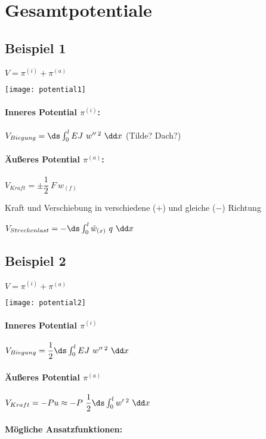 \clearpage
\section{Gesamtpotentiale}
\subsection{Beispiel 1}

	$ V = \pi^{(i)} + \pi^{(a)} $
	
	\texttt{[image: potential1]}
	
	
\paragraph{ Inneres Potential $ \pi^{(i)} $:}
	\qquad $ V_{Biegung} = \ds\int_{0}^{l} E J\ w''\,^2 \ \dd x $  (Tilde? Dach?)
	
\paragraph{ Äußeres Potential $ \pi^{(a)} $:}
	\qquad $ V_{Kraft} = \pm \dfrac{1}{2}\ F\ w_{(f)} $
	
	Kraft und Verschiebung in verschiedene ($ + $) und gleiche ($ - $) Richtung
	
	$ V_{Streckenlast} = -\ds\int_{0}^{l} \tilde{w}_{(x)}\ q\ \dd x $
	
\subsection{Beispiel 2}

	$ V = \pi^{(i)} + \pi^{(a)} $
	
	\texttt{[image: potential2]}
	
\paragraph{ Inneres Potential $ \pi^{(i)} $}
	\qquad $ V_{Biegung}= \dfrac{1}{2} \ds \int_{0}^{l} E J\ w''\, ^2 \ \dd x $
	
\paragraph{ Äußeres Potential $ \pi^{(a)} $}
	\qquad $ V_{Kraft}  = - P u\approx - P\ \dfrac{1}{2}\ds \int_{0}^{l} w'\, ^2 \ \dd x $
	
\paragraph{	Mögliche Ansatzfunktionen:} \quad 

